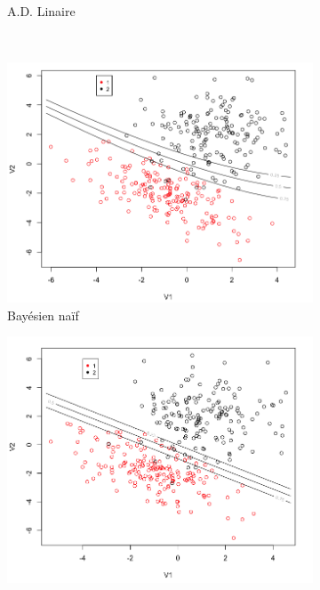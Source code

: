 \documentclass[a4paper,10pt]{report}
\begin{document}
\begin{figure}[H]
\begin{subfigure}[b]{0.45\linewidth}
		\caption{\small A.D. Linaire}
		\label{fig:front-decision-synth-1-adl}%
	\end{subfigure}\\%
	\begin{subfigure}[b]{0.45\linewidth}
		\centering
		\captionsetup{justification=centering, margin=1cm}
		\includegraphics[width=1\linewidth]{img/front-decision-synth-1-nba}
		\caption{\small Bayésien naïf}
		\label{fig:front-decision-synth-1-nba}%
	\end{subfigure}%
	\begin{subfigure}[b]{0.45\linewidth}
		\centering
		\captionsetup{justification=centering, margin=1cm}
		\includegraphics[width=1\linewidth]{img/front-decision-synth-1-reg-log}

\end{subfigure}
\end{figure}
\end{document}
